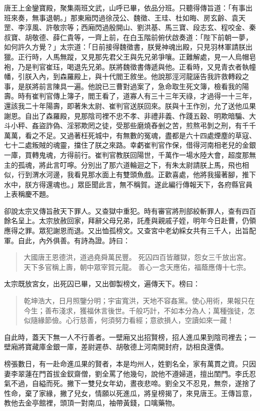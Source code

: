 唐王上金鑾寶殿，聚集兩班文武，山呼已畢，依品分班。只聽得傳旨道：「有事出班來奏，無事退朝。」那東廂閃過徐茂公、魏徵、王珪、杜如晦、房玄齡、袁天罡、李淳風、許敬宗等；西廂閃過殷開山、劉洪基、馬三寶、段志玄、程咬金、秦叔寶、胡敬德、薛仁貴等，一齊上前，在白玉階前俯伏啟奏道：「陛下前朝一夢，如何許久方覺？」太宗道：「日前接得魏徵書，朕覺神魂出殿，只見羽林軍請朕出獵。正行時，人馬無蹤，又見那先君父王與先兄弟爭嚷。正難解處，見一人烏帽皂袍，乃是判官崔珏，喝退先兄弟。朕將魏徵書傳遞與他。正看時，又見青衣者執幢幡，引朕入內，到森羅殿上，與十代閻王敘坐。他說那涇河龍誣告我許救轉殺之事，是朕將前言陳具一遍。他說已三曹對過案了，急命取生死文簿，檢看我的陽壽。時有崔判官傳上簿子，閻王看了，道寡人有三十三年天祿，才過得一十三年，還該我二十年陽壽，即著朱太尉、崔判官送朕回來。朕與十王作別，允了送他瓜果謝恩。自出了森羅殿，見那陰司裡不忠不孝、非禮非義、作踐五穀、明欺暗騙、大斗小秤、姦盜詐偽、淫邪欺罔之徒，受那些磨燒舂剉之苦，煎熬弔剝之刑，有千千萬萬，看之不足。又過著枉死城中，有無數的冤魂，盡都是六十四處煙塵的草寇、七十二處叛賊的魂靈，擋住了朕之來路。幸虧崔判官作保，借得河南相老兒的金銀一庫，買轉鬼魂，方得前行。崔判官教朕回陽世，千萬作一場水陸大會，超度那無主的孤魂，將此言叮嚀。分別出了那六道輪迴之下，有朱太尉請朕上馬，飛也相似，行到渭水河邊，我看見那水面上有雙頭魚戲。正歡喜處，他將我撮著腳，推下水中，朕方得還魂也。」眾臣聞此言，無不稱賀。遂此編行傳報天下，各府縣官員上表稱慶不題。

卻說太宗又傳旨赦天下罪人。又查獄中重犯。時有審官將刑部絞斬罪人，查有四百餘名呈上。太宗放赦回家，拜辭父母兄弟，託產與親戚子姪，明年今日赴曹，仍領應得之罪。眾犯謝恩而退。又出恤孤榜文。又查宮中老幼綵女共有三千人，出旨配軍。自此，內外俱善。有詩為證。詩曰：
\begin{quote}
大國唐王恩德洪，道過堯舜萬民豐。
死囚四百皆離獄，怨女三千放出宮。
天下多官稱上壽，朝中眾宰賀元龍。
善心一念天應佑，福蔭應傳十七宗。
\end{quote}

太宗既放宮女，出死囚已畢，又出御製榜文，遍傳天下。榜曰：
\begin{quote}
乾坤浩大，日月照鑒分明；宇宙寬洪，天地不容姦黨。使心用術，果報只在今生；善布淺求，獲福休言後世。千般巧計，不如本分為人；萬種強徒，怎似隨緣節儉。心行慈善，何須努力看經；意欲損人，空讀如來一藏！
\end{quote}

自此時，蓋天下無一人不行善者。一壁廂又出招賢榜，招人進瓜果到陰司裡去；一壁廂將寶藏庫金銀一庫，差尉遲恭、胡敬德上河南開封府，訪相良還債。

榜張數日，有一赴命進瓜果的賢者，本是均州人，姓劉名全，家有萬貫之資。只因妻李翠蓮在門首拔金釵齋僧，劉全罵了他幾句，說他不遵婦道，擅出閨門。李氏忍氣不過，自縊而死。撇下一雙兒女年幼，晝夜悲啼。劉全又不忍見，無奈，遂捨了性命，棄了家緣，撇了兒女，情願以死進瓜，將皇榜揭了，來見唐王。王傳旨意，教他去金亭館裡，頭頂一對南瓜，袖帶黃錢，口噙藥物。


